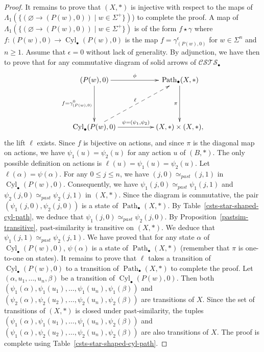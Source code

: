 \documentclass[a4paper,12pt]{amsart}
\begin{document}
\begin{proof}
It remains to prove that $(X,*)$ is injective with respect to the maps
of $\Lambda_1(\{(\varnothing \to (P(w),0)) \mid w\in \Sigma^+\})$) to
complete the proof. A map of $\Lambda_1(\{(\varnothing \to (P(w),0))
\mid w\in \Sigma^+\})$ is of the form $f \star \gamma$ where
$f:(P(w),0)\to \operatorname{{Cyl}}_\bullet(P(w),0)$ is the map
$f=\gamma^\epsilon_{(P(w),0)}$ for $w\in \Sigma^n$ and $n{\geqslant}
1$. Assume that $\epsilon=0$ without lack of generality. By
adjunction, we have then to prove that for any commutative diagram of
solid arrows of ${\mathcal{C\!S\!T\!S}}_\bullet$
\[
\xymatrix@C=5em@R=5em
{
(P(w),0) {\ar@{->}[r]^-{{\phi}}} {\ar@{->}[d]_-{{f=\gamma^0_{(P(w),0)}}}} & {\ar@{->}[d]_-{{\pi}}} \operatorname{{Path}}_\bullet(X,*) \\
\operatorname{{Cyl}}_\bullet(P(w),0) \ar@{-->}[ru]^-{\ell} {\ar@{->}[r]^-{{\psi=(\psi_1,\psi_2)}}} & (X,*)\times (X,*),
}
\]
the lift $\ell$ exists. Since $f$ is bijective on actions, and since
$\pi$ is the diagonal map on actions, we have $\psi_1(u)=\psi_2(u)$
for any action $u$ of $(B,*)$. The only possible definition on actions
is $\ell(u)=\psi_1(u)=\psi_2(u)$. Let $\ell(\alpha)=\psi(\alpha)$.
For any $0{\leqslant} j{\leqslant} n$, we have $(j,0)\simeq_{past} (j,1)$ in
$\operatorname{{Cyl}}_\bullet(P(w),0)$. Consequently, we have
$\psi_1(j,0)\simeq_{past} \psi_1(j,1)$ and $\psi_2(j,0)\simeq_{past}
\psi_2(j,1)$ in $(X,*)$. Since the diagram is commutative, the pair
$(\psi_1(j,0),\psi_2(j,0))$ is a state of $\operatorname{{Path}}_\bullet(X,*)$. By
Table~\ref{csts-star-shaped-cyl-path}, we deduce that $\psi_1(j,0)
\simeq_{past} \psi_2(j,0)$. By Proposition~\ref{pastsim-transitive},
past-similarity is transitive on $(X,*)$.  We deduce that $\psi_1(j,1)
\simeq_{past} \psi_2(j,1)$. We have proved that for any state $\alpha$
of $\operatorname{{Cyl}}_\bullet(P(w),0)$, $\psi(\alpha)$ is a state of
$\operatorname{{Path}}_\bullet(X,*)$ (remember that $\pi$ is one-to-one on
states). It remains to prove that $\ell$ takes a transition of
$\operatorname{{Cyl}}_\bullet(P(w),0)$ to a transition of $\operatorname{{Path}}_\bullet(X,*)$ to
complete the proof. Let $(\alpha,u_1,\dots,u_n,\beta)$ be a transition
of $\operatorname{{Cyl}}_\bullet(P(w),0)$. Then both
$(\psi_1(\alpha),\psi_1(u_1),\dots,\psi_1(u_n),\psi_1(\beta))$ and
$(\psi_2(\alpha),\psi_2(u_2),\dots,\psi_2(u_n),\psi_2(\beta))$ are
transitions of $X$. Since the set of transitions of $(X,*)$ is closed
under past-similarity, the tuples
$(\psi_1(\alpha),\psi_1(u_1),\dots,\psi_1(u_n),\psi_2(\beta))$ and
$(\psi_1(\alpha),\psi_2(u_2),\dots,\psi_2(u_n),\psi_2(\beta))$ are
also transitions of $X$. The proof is complete using
Table~\ref{csts-star-shaped-cyl-path}.  \end{proof}
\end{document}
